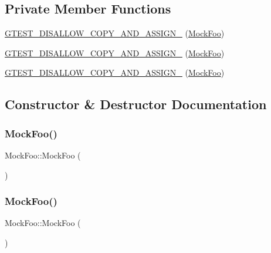 \subsection*{Private Member Functions}
\begin{DoxyCompactItemize}
\item 
\mbox{\hyperlink{class_mock_foo_a2919ec5552ea98597059750e7533a76c}{G\+T\+E\+S\+T\+\_\+\+D\+I\+S\+A\+L\+L\+O\+W\+\_\+\+C\+O\+P\+Y\+\_\+\+A\+N\+D\+\_\+\+A\+S\+S\+I\+G\+N\+\_\+}} (\mbox{\hyperlink{class_mock_foo}{Mock\+Foo}})
\item 
\mbox{\hyperlink{class_mock_foo_a2919ec5552ea98597059750e7533a76c}{G\+T\+E\+S\+T\+\_\+\+D\+I\+S\+A\+L\+L\+O\+W\+\_\+\+C\+O\+P\+Y\+\_\+\+A\+N\+D\+\_\+\+A\+S\+S\+I\+G\+N\+\_\+}} (\mbox{\hyperlink{class_mock_foo}{Mock\+Foo}})
\item 
\mbox{\hyperlink{class_mock_foo_a2919ec5552ea98597059750e7533a76c}{G\+T\+E\+S\+T\+\_\+\+D\+I\+S\+A\+L\+L\+O\+W\+\_\+\+C\+O\+P\+Y\+\_\+\+A\+N\+D\+\_\+\+A\+S\+S\+I\+G\+N\+\_\+}} (\mbox{\hyperlink{class_mock_foo}{Mock\+Foo}})
\end{DoxyCompactItemize}


\subsection{Constructor \& Destructor Documentation}
\mbox{\label{class_mock_foo_a2821e632963d0ea4af66a7ce7ed36a8f}} 
\subsubsection{\texorpdfstring{MockFoo()}{MockFoo()}\hspace{0.1cm}{\footnotesize\ttfamily [1/3]}}
{\footnotesize\ttfamily Mock\+Foo\+::\+Mock\+Foo (\begin{DoxyParamCaption}{ }\end{DoxyParamCaption})\hspace{0.3cm}{\ttfamily [inline]}}

\mbox{\label{class_mock_foo_a2821e632963d0ea4af66a7ce7ed36a8f}} 
\subsubsection{\texorpdfstring{MockFoo()}{MockFoo()}\hspace{0.1cm}{\footnotesize\ttfamily [2/3]}}
{\footnotesize\ttfamily Mock\+Foo\+::\+Mock\+Foo (\begin{DoxyParamCaption}{ }\end{DoxyParamCaption})\hspace{0.3cm}{\ttfamily [inline]}}

